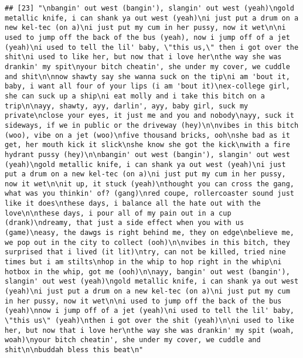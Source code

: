 \documentclass[]{article}
\begin{document}
\begin{verbatim}
## [23] "\nbangin' out west (bangin'), slangin' out west (yeah)\ngold metallic knife, i can shank ya out west (yeah)\ni just put a drum on a new kel-tec (on a)\ni just put my cum in her pussy, now it wet\n\ni used to jump off the back of the bus (yeah), now i jump off of a jet (yeah)\ni used to tell the lil' baby, \"this us,\" then i got over the shit\ni used to like her, but now that i love her\nthe way she was drankin' my spit\nyour bitch cheatin', she under my cover, we cuddle and shit\n\nnow shawty say she wanna suck on the tip\ni am 'bout it, baby, i want all four of your lips (i am 'bout it)\nex-college girl, she can suck up a ship\ni eat molly and i take this bitch on a trip\n\nayy, shawty, ayy, darlin', ayy, baby girl, suck my private\nclose your eyes, it just me and you and nobody\nayy, suck it sideways, if we in public or the driveway (hey)\n\nvibes in this bitch (woo), vibe on a jet (woo)\nfive thousand bricks, ooh\nshe bad as it get, her mouth kick it slick\nshe know she got the kick\nwith a fire hydrant pussy (hey)\n\nbangin' out west (bangin'), slangin' out west (yeah)\ngold metallic knife, i can shank ya out west (yeah)\ni just put a drum on a new kel-tec (on a)\ni just put my cum in her pussy, now it wet\n\nit up, it stuck (yeah)\nthought you can cross the gang, what was you thinkin' of? (gang)\nred coupe, rollercoaster sound just like it does\nthese days, i balance all the hate out with the love\n\nthese days, i pour all of my pain out in a cup (drank)\ndreamy, that just a side effect when you with us (game)\neasy, the dawgs is right behind me, they on edge\nbelieve me, we pop out in the city to collect (ooh)\n\nvibes in this bitch, they surprised that i lived (it lit)\ntry, can not be killed, tried nine times but i am stilts\nhop in the whip to hop right in the whip\ni hotbox in the whip, got me (ooh)\n\nayy, bangin' out west (bangin'), slangin' out west (yeah)\ngold metallic knife, i can shank ya out west (yeah)\ni just put a drum on a new kel-tec (on a)\ni just put my cum in her pussy, now it wet\n\ni used to jump off the back of the bus (yeah)\nnow i jump off of a jet (yeah)\ni used to tell the lil' baby, \"this us\" (yeah)\nthen i got over the shit (yeah)\n\ni used to like her, but now that i love her\nthe way she was drankin' my spit (woah, woah)\nyour bitch cheatin', she under my cover, we cuddle and shit\n\nbuddah bless this beat\n"                                                                                                                                                                                                                                                                                                                                                                                                                                                                                                                                                                                                                                                                                                                                                                                                                                                                                                                                                        
\end{verbatim}
\end{document}
